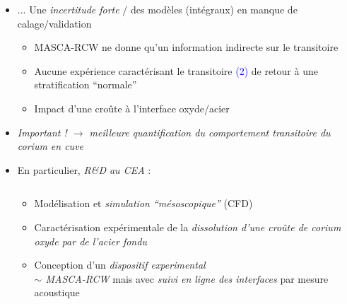 \begin{frame}[fragile]
\begin{itemize}
\item ... Une \emph{incertitude forte} / des modèles (intégraux) en manque de calage/validation
\begin{itemize}
\item MASCA-RCW ne donne qu'un information indirecte sur le transitoire
\item Aucune expérience caractérisant le transitoire \textcolor{blue}{(2)} de retour à une stratification ``normale'' 
\item Impact d'une croûte à l'interface oxyde/acier
\end{itemize}
\item \emph{Important ! $\rightarrow$ meilleure quantification du comportement transitoire du corium en cuve}
\item En particulier, \emph{R\&D au CEA} :
\begin{columns}
 \begin{column}{0.55\textwidth}
\begin{itemize}
\item Modélisation et \emph{simulation ``mésoscopique''} (CFD) \cite{Zanella2020}
\item Caractérisation expérimentale de la \emph{dissolution d'une croûte de corium oxyde par de l'acier fondu} \cite{Pivano2019}
\item Conception d'un \emph{dispositif experimental \\ $\sim$ MASCA-RCW} mais avec \emph{suivi en ligne des interfaces} par mesure acoustique \cite{Cavaro2019}
\end{itemize}
 \end{column}
 \begin{column}{0.1\textwidth}
 \begin{minipage}{\textwidth}

\end{minipage}
\end{column}
\end{columns}
\end{itemize}
\end{frame}
